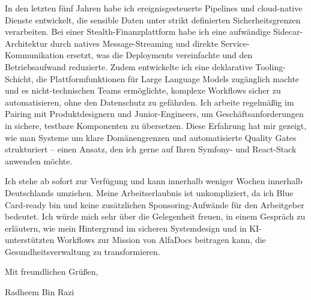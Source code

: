 \documentclass[11pt,a4paper]{coverletter}
\begin{document}
In den letzten fünf Jahren habe ich ereignisgesteuerte Pipelines und cloud-native Dienste entwickelt, die sensible Daten unter strikt definierten Sicherheitsgrenzen verarbeiten. Bei einer Stealth-Finanzplattform habe ich eine aufwändige Sidecar-Architektur durch natives Message-Streaming und direkte Service-Kommunikation ersetzt, was die Deployments vereinfachte und den Betriebsaufwand reduzierte. Zudem entwickelte ich eine deklarative Tooling-Schicht, die Plattformfunktionen für Large Language Models zugänglich machte und es nicht-technischen Teams ermöglichte, komplexe Workflows sicher zu automatisieren, ohne den Datenschutz zu gefährden. Ich arbeite regelmäßig im Pairing mit Produktdesignern und Junior-Engineers, um Geschäftsanforderungen in sichere, testbare Komponenten zu übersetzen. Diese Erfahrung hat mir gezeigt, wie man Systeme um klare Domänengrenzen und automatisierte Quality Gates strukturiert – einen Ansatz, den ich gerne auf Ihren Symfony- und React-Stack anwenden möchte.

Ich stehe ab sofort zur Verfügung und kann innerhalb weniger Wochen innerhalb Deutschlands umziehen. Meine Arbeitserlaubnis ist unkompliziert, da ich Blue Card-ready bin und keine zusätzlichen Sponsoring-Aufwände für den Arbeitgeber bedeutet. Ich würde mich sehr über die Gelegenheit freuen, in einem Gespräch zu erläutern, wie mein Hintergrund im sicheren Systemdesign und in KI-unterstützten Workflows zur Mission von AlfaDocs beitragen kann, die Gesundheitsverwaltung zu transformieren.

\closing{Mit freundlichen Grüßen,}{Radheem Bin Razi}
\end{document}

